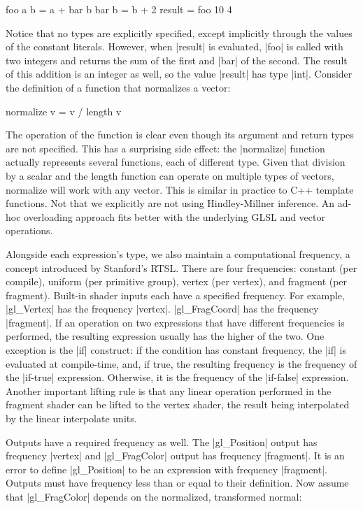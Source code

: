 \documentclass{acmsiggraph}               %
\begin{document}
\begin{MyVerb}
foo a b = a + bar b
bar b = b + 2
result = foo 10 4
\end{MyVerb}

Notice that no types are explicitly specified, except implicitly
through the values of the constant literals.  However, when |result|
is evaluated, |foo| is called with two integers and returns the sum of
the first and |bar| of the second.  The result of this addition is an
integer as well, so the value |result| has type |int|.  Consider the
definition of a function that normalizes a vector:

\begin{MyVerb}
normalize v = v / length v
\end{MyVerb}

The operation of the function is clear even though its argument and
return types are not specified.  This has a surprising side effect:
the |normalize| function actually represents several functions, each
of different type.  Given that division by a scalar and the length
function can operate on multiple types of vectors, normalize will work
with any vector.  This is similar in practice to C++ template
functions.  Not that we explicitly are not using Hindley-Millner
inference.  An ad-hoc overloading approach fits better with the
underlying GLSL and vector operations.

Alongside each expression's type, we also maintain a computational
frequency, a concept introduced by Stanford's RTSL.  There are four
frequencies: constant (per compile), uniform (per primitive group),
vertex (per vertex), and fragment (per fragment).  Built-in shader
inputs each have a specified frequency.  For example, |gl_Vertex| has
the frequency |vertex|.  |gl_FragCoord| has the frequency |fragment|.
If an operation on two expressions that have different frequencies is
performed, the resulting expression usually has the higher of the two.
One exception is the |if| construct: if the condition has constant
frequency, the |if| is evaluated at compile-time, and, if true, the
resulting frequency is the frequency of the |if-true| expression.
Otherwise, it is the frequency of the |if-false| expression.  Another
important lifting rule is that any linear operation performed in the
fragment shader can be lifted to the vertex shader, the result being
interpolated by the linear interpolate units.

Outputs have a required frequency as well.  The |gl_Position| output
has frequency |vertex| and |gl_FragColor| output has frequency
|fragment|.  It is an error to define |gl_Position| to be an
expression with frequency |fragment|.  Outputs must have frequency
less than or equal to their definition.  Now assume that
|gl_FragColor| depends on the normalized, transformed normal:
\end{document}

